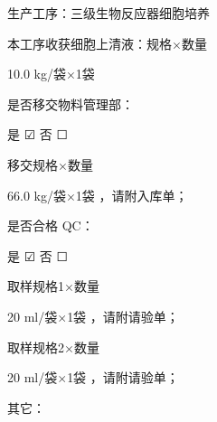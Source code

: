 \documentclass[UTF8,10pt,a4paper,fontset=fandol]{ctexart}
\newcommand{\fieldvalue}[1]{#1}
\newcommand{\handwritten}[1]{#1}
\newcommand{\checkboxfield}[1]{\ifstrequal{#1}{checked}{☑}{\ifstrequal{#1}{unclear}{?}{☐}}}
\begin{document}
\vspace{0.6em}

\noindent
生产工序：三级生物反应器细胞培养

\vspace{0.6em}

\noindent
本工序收获细胞上清液：规格$\times$数量

\fieldvalue{\handwritten{10.0 kg/袋$\times$1袋}}

\vspace{0.6em}

\noindent
是否移交物料管理部：

是
\fieldvalue{\checkboxfield{checked}}
\quad
否
\fieldvalue{\checkboxfield{unchecked}}

\vspace{0.6em}

\noindent
移交规格$\times$数量

\fieldvalue{\handwritten{66.0 kg/袋$\times$1袋}}
，请附入库单；

\vspace{0.6em}

\noindent
是否合格 QC：

是
\fieldvalue{\checkboxfield{checked}}
\quad
否
\fieldvalue{\checkboxfield{unchecked}}

\vspace{0.6em}

\noindent
取样规格1$\times$数量

\fieldvalue{\handwritten{20 ml/袋$\times$1袋}}
，请附请验单；

\vspace{0.6em}

\noindent
取样规格2$\times$数量

\fieldvalue{\handwritten{20 ml/袋$\times$1袋}}
，请附请验单；

\vspace{0.6em}

\noindent
其它：
\end{document}
